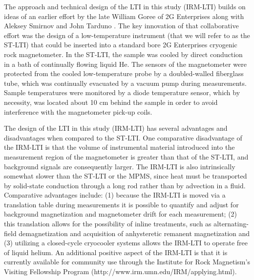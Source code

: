 \documentclass[draft,gc]{AGUTeX}
\begin{document}
\begin{article}
The approach and technical design of the LTI in this study (IRM-LTI) builds on ideas of an earlier effort by the late William Goree of 2G Enterprises along with Aleksey Smirnov and John Tarduno \citep{Smirnov2011a}. The key innovation of that collaborative effort was the design of a low-temperature instrument (that we will refer to as the ST-LTI) that could be inserted into a standard bore 2G Enterprises cryogenic rock magnetometer. In the ST-LTI, the sample was cooled by direct conduction in a bath of continually flowing liquid He. The sensors of the magnetometer were protected from the cooled low-temperature probe by a doubled-walled fiberglass tube, which was continually evacuated by a vacuum pump during measurements. Sample temperatures were monitored by a diode temperature sensor, which by necessity, was located about 10 cm behind the sample in order to avoid interference with the magnetometer pick-up coils. 

The design of the LTI in this study (IRM-LTI) has several advantages and disadvantages when compared to the ST-LTI. One comparative disadvantage of the IRM-LTI is that the volume of instrumental material introduced into the measurement region of the magnetometer is greater than that of the ST-LTI, and background signals are consequently larger.  The IRM-LTI is also intrinsically somewhat slower than the ST-LTI or the MPMS, since heat must be transported by solid-state conduction through a long rod rather than by advection in a fluid. Comparative advantages include: (1) because the IRM-LTI is moved via a translation table during measurements it is possible to quantify and adjust for background magnetization and magnetometer drift for each measurement; (2) this translation allows for the possibility of inline treatments, such as alternating-field demagnetization and acquisition of anhysteretic remanent magnetization and (3) utilizing a closed-cycle cryocooler systems allows the IRM-LTI to operate free of liquid helium. An additional positive aspect of the IRM-LTI is that it is currently available for community use through the Institute for Rock Magnetism's Visiting Fellowship Program (http://www.irm.umn.edu/IRM/applying.html).    


\end{article}
\end{document}
